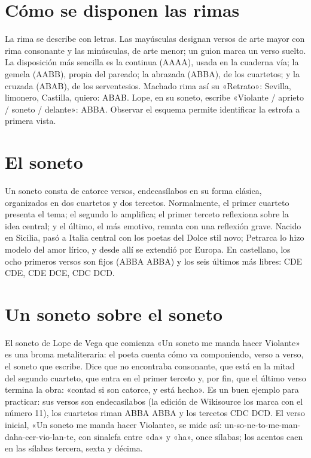 \documentclass{book}
\begin{document}

\section{Cómo se disponen las rimas}

La rima se describe con letras. Las mayúsculas designan versos de arte mayor con rima consonante y las minúsculas, de arte menor; un guion marca un verso suelto. La disposición más sencilla es la continua (AAAA), usada en la cuaderna vía; la gemela (AABB), propia del pareado; la abrazada (ABBA), de los cuartetos; y la cruzada (ABAB), de los serventesios. Machado rima así su «Retrato»: Sevilla, limonero, Castilla, quiero: ABAB. Lope, en su soneto, escribe «Violante / aprieto / soneto / delante»: ABBA. Observar el esquema permite identificar la estrofa a primera vista.


\section{El soneto}

Un soneto consta de catorce versos, endecasílabos en su forma clásica, organizados en dos cuartetos y dos tercetos. Normalmente, el primer cuarteto presenta el tema; el segundo lo amplifica; el primer terceto reflexiona sobre la idea central; y el último, el más emotivo, remata con una reflexión grave. Nacido en Sicilia, pasó a Italia central con los poetas del Dolce stil novo; Petrarca lo hizo modelo del amor lírico, y desde allí se extendió por Europa. En castellano, los ocho primeros versos son fijos (ABBA ABBA) y los seis últimos más libres: CDE CDE, CDE DCE, CDC DCD.


\section{Un soneto sobre el soneto}

El soneto de Lope de Vega que comienza «Un soneto me manda hacer Violante» es una broma metaliteraria: el poeta cuenta cómo va componiendo, verso a verso, el soneto que escribe. Dice que no encontraba consonante, que está en la mitad del segundo cuarteto, que entra en el primer terceto y, por fin, que el último verso termina la obra: «contad si son catorce, y está hecho». Es un buen ejemplo para practicar: sus versos son endecasílabos (la edición de Wikisource los marca con el número 11), los cuartetos riman ABBA ABBA y los tercetos CDC DCD. El verso inicial, «Un soneto me manda hacer Violante», se mide así: un-so-ne-to-me-man-daha-cer-vio-lan-te, con sinalefa entre «da» y «ha», once sílabas; los acentos caen en las sílabas tercera, sexta y décima.
\end{document}
